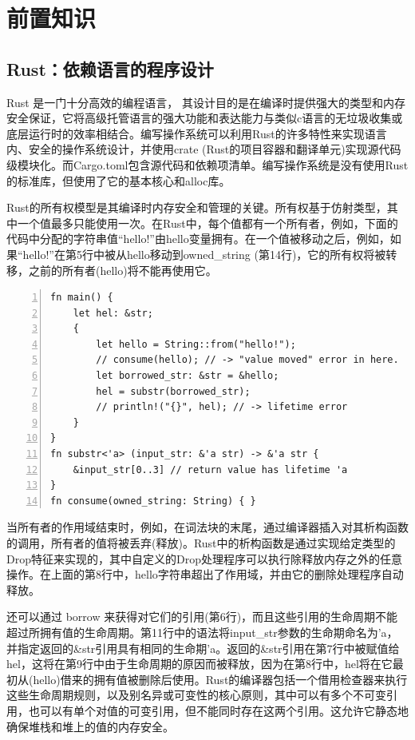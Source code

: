 \chapter{前置知识}
\label{chap:knowledge}

\section{Rust：依赖语言的程序设计}

Rust 是一门十分高效的编程语言， 其设计目的是在编译时提供强大的类型和内存安全保证，它将高级托管语言的强大功能和表达能力与类似c语言的无垃圾收集或底层运行时的效率相结合。编写操作系统可以利用Rust的许多特性来实现语言内、安全的操作系统设计，并使用crate (Rust的项目容器和翻译单元)实现源代码级模块化。而Cargo.toml包含源代码和依赖项清单。编写操作系统是没有使用Rust的标准库，但使用了它的基本核心和alloc库。

Rust的所有权模型是其编译时内存安全和管理的关键。所有权基于仿射类型，其中一个值最多只能使用一次。在Rust中，每个值都有一个所有者，例如，下面的代码中分配的字符串值“hello!”由hello变量拥有。在一个值被移动之后，例如，如果“hello!”在第5行中被从hello移动到owned\_string (第14行)，它的所有权将被转移，之前的所有者(hello)将不能再使用它。

\begin{lstlisting}[caption=Rust Demo, numbers=left]
fn main() {
	let hel: &str;
	{
		let hello = String::from("hello!");
		// consume(hello); // -> "value moved" error in here.
		let borrowed_str: &str = &hello;
		hel = substr(borrowed_str);
		// println!("{}", hel); // -> lifetime error
	}
}
fn substr<'a> (input_str: &'a str) -> &'a str {
	&input_str[0..3] // return value has lifetime 'a
}
fn consume(owned_string: String) { }
\end{lstlisting}


当所有者的作用域结束时，例如，在词法块的末尾，通过编译器插入对其析构函数的调用，所有者的值将被丢弃(释放)。Rust中的析构函数是通过实现给定类型的Drop特征来实现的，其中自定义的Drop处理程序可以执行除释放内存之外的任意操作。在上面的第8行中，hello字符串超出了作用域，并由它的删除处理程序自动释放。

还可以通过 borrow 来获得对它们的引用(第6行)，而且这些引用的生命周期不能超过所拥有值的生命周期。第11行中的语法将input\_str参数的生命期命名为'a，并指定返回的\&str引用具有相同的生命期'a。返回的\&str引用在第7行中被赋值给hel，这将在第9行中由于生命周期的原因而被释放，因为在第8行中，hel将在它最初从(hello)借来的拥有值被删除后使用。Rust的编译器包括一个借用检查器来执行这些生命周期规则，以及别名异或可变性的核心原则，其中可以有多个不可变引用，也可以有单个对值的可变引用，但不能同时存在这两个引用。这允许它静态地确保堆栈和堆上的值的内存安全。

